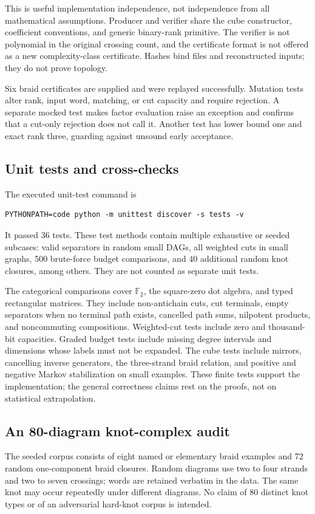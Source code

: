 \documentclass[11pt,letterpaper]{article}
\theoremstyle{definition}\newtheorem{definition}[theorem]{Definition}
\theoremstyle{remark}\newtheorem{remark}[theorem]{Remark}
\newcommand{\F}{\mathbb F_2}
\begin{document}
This is useful implementation independence, not independence from all
mathematical assumptions. Producer and verifier share the cube constructor,
coefficient conventions, and generic binary-rank primitive. The verifier
is not polynomial in the original crossing count, and the certificate
format is not offered as a new complexity-class certificate. Hashes bind
files and reconstructed inputs; they do not prove topology.

Six braid certificates are supplied and were replayed successfully.
Mutation tests alter rank, input word, matching, or cut capacity and require
rejection. A separate mocked test makes factor evaluation raise an exception
and confirms that a cut-only rejection does not call it. Another test has
lower bound one and exact rank three, guarding against unsound early
acceptance.

\subsection{Unit tests and cross-checks}
The executed unit-test command is
\begin{lstlisting}
PYTHONPATH=code python -m unittest discover -s tests -v
\end{lstlisting}
It passed 36 tests. These test methods contain multiple exhaustive or seeded
subcases: valid separators in random small DAGs, all weighted cuts in small
graphs, 500 brute-force budget comparisons, and 40 additional random knot
closures, among others. They are not counted as separate unit tests.

The categorical comparisons cover $\F$, the square-zero dot algebra, and
typed rectangular matrices. They include non-antichain cuts, cut terminals,
empty separators when no terminal path exists, cancelled path sums,
nilpotent products, and noncommuting compositions. Weighted-cut tests include
zero and thousand-bit capacities. Graded budget tests include missing degree
intervals and dimensions whose labels must not be expanded. The cube tests
include mirrors, cancelling inverse generators, the three-strand braid
relation, and positive and negative Markov stabilization on small examples.
These finite tests support the implementation; the general correctness
claims rest on the proofs, not on statistical extrapolation.

\subsection{An 80-diagram knot-complex audit}
The seeded corpus consists of eight named or elementary braid examples and
72 random one-component braid closures. Random diagrams use two to four
strands and two to seven crossings; words are retained verbatim in the data.
The same knot may occur repeatedly under different diagrams. No claim of
80 distinct knot types or of an adversarial hard-knot corpus is intended.
\end{document}
